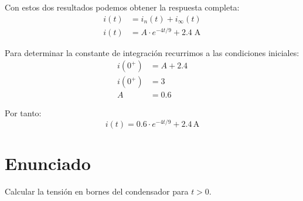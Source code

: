 \vspace{4mm}
Con estos dos resultados podemos obtener la respuesta completa:
\begin{align*}
  i(t) &= i_n(t) + i_\infty(t)\\[3pt]
  i(t) &= A \cdot e^{-4t/9} + 2.4 \;\si{\ampere}
\end{align*}

Para determinar la constante de integración recurrimos a las
condiciones iniciales:
\begin{align*}
  i(0^+) &= A + 2.4 \\
  i(0^+) &= 3 \\
  A &= 0.6
\end{align*}

Por tanto:
\begin{equation*}
  i(t) = 0.6 \cdot e^{-4t/9} + 2.4 \,\si{\ampere}
\end{equation*}

\section{Enunciado}

Calcular la tensión en bornes del condensador para $t > 0$.

